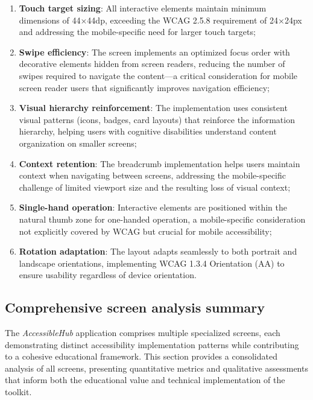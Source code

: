 \begin{enumerate}
    \item \textbf{Touch target sizing}: All interactive elements maintain minimum dimensions of 44×44dp, exceeding the WCAG 2.5.8 requirement of 24×24px and addressing the mobile-specific need for larger touch targets;
    
    \item \textbf{Swipe efficiency}: The screen implements an optimized focus order with decorative elements hidden from screen readers, reducing the number of swipes required to navigate the content—a critical consideration for mobile screen reader users that significantly improves navigation efficiency;
    
    \item \textbf{Visual hierarchy reinforcement}: The implementation uses consistent visual patterns (icons, badges, card layouts) that reinforce the information hierarchy, helping users with cognitive disabilities understand content organization on smaller screens;
    
    \item \textbf{Context retention}: The breadcrumb implementation helps users maintain context when navigating between screens, addressing the mobile-specific challenge of limited viewport size and the resulting loss of visual context;
    
    \item \textbf{Single-hand operation}: Interactive elements are positioned within the natural thumb zone for one-handed operation, a mobile-specific consideration not explicitly covered by WCAG but crucial for mobile accessibility;
    
    \item \textbf{Rotation adaptation}: The layout adapts seamlessly to both portrait and landscape orientations, implementing WCAG 1.3.4 Orientation (AA) to ensure usability regardless of device orientation.
\end{enumerate}

\FloatBarrier 

\subsection{Comprehensive screen analysis summary}
\label{subsec:comprehensive-screen-analysis}

The \textit{AccessibleHub} application comprises multiple specialized screens, each demonstrating distinct accessibility implementation patterns while contributing to a cohesive educational framework. This section provides a consolidated analysis of all screens, presenting quantitative metrics and qualitative assessments that inform both the educational value and technical implementation of the toolkit. \\

